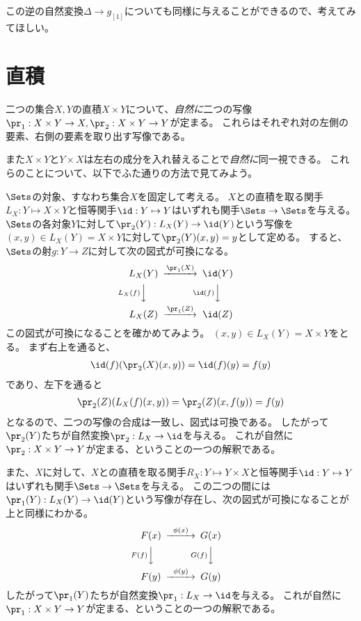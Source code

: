 \documentclass{jsarticle}
\begin{document}
この逆の自然変換$\Delta \to g_{[1]}$についても同様に与えることができるので、考えてみてほしい。

\section{直積}
二つの集合$X, Y$の直積$X \times Y$について、\emph{自然に}二つの写像$\pr_1:X \times Y \to X, \pr_2:X \times Y \to Y$が定まる。
これらはそれぞれ対の左側の要素、右側の要素を取り出す写像である。

また$X \times Y$と$Y \times X$は左右の成分を入れ替えることで\emph{自然に}同一視できる。
これらのことについて、以下でふた通りの方法で見てみよう。

\vspace{10pt}

$\Sets$の対象、すなわち集合$X$を固定して考える。
$X$との直積を取る関手$L_X:Y \mapsto X \times Y$と恒等関手$\id:Y \mapsto Y$はいずれも関手$\Sets \to \Sets$を与える。
$\Sets$の各対象$Y$に対して$\pr_2(Y):L_X(Y) \to \id(Y)$という写像を$(x,y) \in L_X(Y)=X\times Y$に対して$\pr_2(Y)(x,y)=y$として定める。
すると、$\Sets$の射$g:Y \to Z$に対して次の図式が可換になる。
\[
\begin{CD}
L_X(Y)@>\pr_1(X)>>\id(Y)\\
@VL_X(f)VV@V\id(f)VV\\
L_X(Z)@>\pr_1(Z)>>\id(Z)
\end{CD}
\]
この図式が可換になることを確かめてみよう。
$(x,y) \in L_X(Y)=X\times Y$をとる。
まず右上を通ると、
\begin{align*}
\id(f)(\pr_2(X)(x,y))=\id(f)(y)=f(y)
\end{align*}
であり、左下を通ると
\begin{align*}
\pr_2(Z)(L_X(f)(x,y))=\pr_2(Z)(x,f(y))=f(y)
\end{align*}
となるので、二つの写像の合成は一致し、図式は可換である。
したがって$\pr_2(Y)$たちが自然変換$\pr_2:L_X \to \id$を与える。
これが自然に$\pr_2:X \times Y \to Y$が定まる、ということの一つの解釈である。

また、$X$に対して、$X$との直積を取る関手$R_X:Y \mapsto Y \times X$と恒等関手$\id:Y \mapsto Y$はいずれも関手$\Sets \to \Sets$を与える。
この二つの間には$\pr_1(Y):L_X(Y) \to \id(Y)$という写像が存在し、次の図式が可換になることが上と同様にわかる。
\[
\begin{CD}
F(x)@>\phi(x)>>G(x)\\
@VF(f)VV@VG(f)VV\\
F(y)@>\phi(y)>>G(y)
\end{CD}
\]
したがって$\pr_1(Y)$たちが自然変換$\pr_1:L_X \to \id$を与える。
これが自然に$\pr_1:X \times Y \to Y$が定まる、ということの一つの解釈である。
\end{document}
